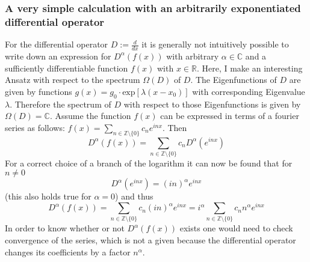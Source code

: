 \documentclass[11pt, xcolor=dvipsnames]{beamer}
\begin{document}
\begin{frame}
\frametitle{A very simple calculation with an arbitrarily exponentiated differential operator}

For the differential operator $D:=\frac{d}{dx}$ it is generally not intuitively possible to write down an expression for $D^{\alpha}(f(x))$ with arbitrary $\alpha \in \mathbb{C}$ and a sufficiently differentiable function $f(x)$ with $x\in \mathbb{R}$. Here, I make an interesting Ansatz with respect to the spectrum $\Omega (D)$ of $D$. The Eigenfunctions of $D$ are given by functions $g(x) = g_0\cdot\text{exp}\left[\lambda (x-x_0)\right]$ with corresponding Eigenvalue $\lambda$. Therefore the spectrum of $D$ with respect to those Eigenfunctions is given by $\Omega (D) = \mathbb{C}$. Assume the function $f(x)$ can be expressed in terms of a fourier series as follows: $f(x) =\sum_{n\in \mathbb{Z}\setminus \lbrace 0 \rbrace} c_n e^{ i nx} $. Then
\begin{equation}
  D^{\alpha} (f(x)) = \sum_{n\in \mathbb{Z}\setminus \lbrace 0 \rbrace} c_n D^{\alpha} (e^{ i nx}) 
\end{equation}
For a correct choice of a branch of the logarithm it can now be found that for $n\neq 0$
\begin{equation}
    D^{\alpha} (e^{i nx}) =  ( i n)^{\alpha} e^{ i nx} 
\end{equation}
(this also holds true for $\alpha =0$) and thus
\begin{equation}
    \boxed{D^{\alpha} (f(x)) = \sum_{n\in \mathbb{Z}\setminus \lbrace 0\rbrace} c_n ( i n)^{\alpha} e^{ i nx} = i^{\alpha}\sum_{n\in \mathbb{Z}\setminus \lbrace 0\rbrace} c_n n^{\alpha} e^{ i nx}}
\end{equation}
In order to know whether or not $D^{\alpha} (f(x))$ exists one would need to check convergence of the series, which is not a given because the differential operator changes its coefficients by a factor $n^{\alpha}$.

\end{frame}
\end{document}
